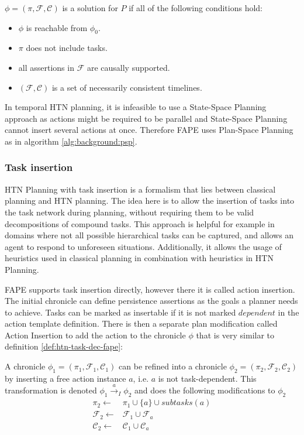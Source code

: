 \begin{definition}
  $\phi = (\pi,\mathcal{F},\mathcal{C})$ is a solution for $P$ if all of the following conditions hold:
  \begin{itemize}
    \item $\phi$ is reachable from $\phi_0$.
    \item $\pi$ does not include tasks.
    \item all assertions in $\mathcal{F}$ are causally supported.
    \item $(\mathcal{F},\mathcal{C})$ is a set of necessarily consistent timelines.
  \end{itemize}
\end{definition}

In temporal HTN planning, it is infeasible to use a State-Space Planning approach as actions might be required to be parallel and State-Space Planning cannot insert several actions at once.
Therefore FAPE uses Plan-Space Planning as in algorithm \ref{alg:background:psp}.

\subsubsection{Task insertion}

HTN Planning with task insertion is a formalism that lies between classical planning and HTN planning.
The idea here is to allow the insertion of tasks into the task network during planning, without requiring them to be valid decompositions of compound tasks.
This approach is helpful for example in domains where not all possible hierarchical tasks can be captured, and allows an agent to respond to unforeseen situations.
Additionally, it allows the usage of heuristics used in classical planning in combination with heuristics in HTN Planning.

FAPE supports task insertion directly, however there it is called action insertion.
The initial chronicle can define persistence assertions as the goals a planner needs to achieve.
Tasks can be marked as insertable if it is not marked $dependent$ in the action template definition.
There is then a separate plan modification called Action Insertion to add the action to the chronicle $\phi$ that is very similar to definition \ref{def:htn-task-dec-fape}:

\begin{definition}
  A chronicle $\phi_1 = (\pi_1,\mathcal{F}_1,\mathcal{C}_1)$ can be refined into a chronicle $\phi_2 = (\pi_2,\mathcal{F}_2,\mathcal{C}_2)$ by inserting a free action instance $a$, i.e. $a$ is not task-dependent. This transformation is denoted $\phi_1 \xrightarrow{a}_I \phi_2$ and does the following modifications to $\phi_2$
  \begin{align*}
    \pi_2 \leftarrow & \pi_1 \cup \{a\} \cup subtasks(a) \\
    \mathcal{F}_2 \leftarrow & \mathcal{F}_1 \cup \mathcal{F}_a \\
    \mathcal{C}_2 \leftarrow & \mathcal{C}_1 \cup \mathcal{C}_a \\
  \end{align*}
\end{definition}

